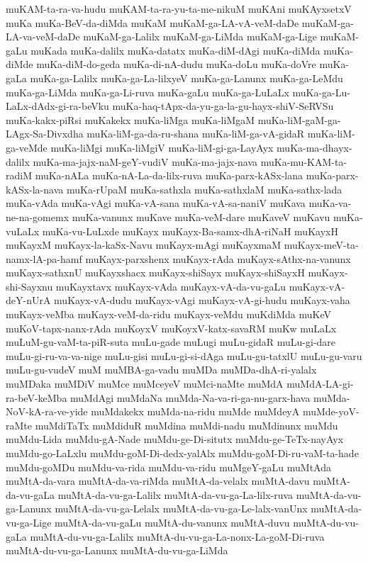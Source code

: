 {muKAM-ta-ra-va-hudu
muKAM-ta-ra-yu-ta-me-nikuM
muKAni
muKAyxsetxV
muKa
muKa-BeV-da-diMda
muKaM
muKaM-ga-LA-vA-veM-daDe
muKaM-ga-LA-va-veM-daDe
muKaM-ga-Lalilx
muKaM-ga-LiMda
muKaM-ga-Lige
muKaM-gaLu
muKada
muKa-dalilx
muKa-datatx
muKa-diM-dAgi
muKa-diMda
muKa-diMde
muKa-diM-do-geda
muKa-di-nA-dudu
muKa-doLu
muKa-doVre
muKa-gaLa
muKa-ga-Lalilx
muKa-ga-La-lilxyeV
muKa-ga-Lanunx
muKa-ga-LeMdu
muKa-ga-LiMda
muKa-ga-Li-ruva
muKa-gaLu
muKa-ga-LuLaLx
muKa-ga-Lu-LaLx-dAdx-gi-ra-beVku
muKa-haq-tApx-da-yu-ga-la-gu-hayx-shiV-SeRVSu
muKa-kakx-piRsi
muKakekx
muKa-liMga
muKa-liMgaM
muKa-liM-gaM-ga-LAgx-Sa-Divxdha
muKa-liM-ga-da-ru-shana
muKa-liM-ga-vA-gidaR
muKa-liM-ga-veMde
muKa-liMgi
muKa-liMgiV
muKa-liM-gi-ga-LayAyx
muKa-ma-dhayx-dalilx
muKa-ma-jajx-naM-geY-vudiV
muKa-ma-jajx-nava
muKa-mu-KAM-ta-radiM
muKa-nALa
muKa-nA-La-da-lilx-ruva
muKa-parx-kASx-lana
muKa-parx-kASx-la-nava
muKa-rUpaM
muKa-sathxla
muKa-sathxlaM
muKa-sathx-lada
muKa-vAda
muKa-vAgi
muKa-vA-sana
muKa-vA-sa-naniV
muKava
muKa-va-ne-na-gomemx
muKa-vanunx
muKave
muKa-veM-dare
muKaveV
muKavu
muKa-vuLaLx
muKa-vu-LuLxde
muKayx
muKayx-Ba-samx-dhA-riNaH
muKayxH
muKayxM
muKayx-la-kaSx-Navu
muKayx-mAgi
muKayxmaM
muKayx-meV-ta-namx-lA-pa-hamf
muKayx-parxshenx
muKayx-rAda
muKayx-sAthx-na-vanunx
muKayx-sathxnU
muKayxshacx
muKayx-shiSayx
muKayx-shiSayxH
muKayx-shi-Sayxnu
muKayxtavx
muKayx-vAda
muKayx-vA-da-vu-gaLu
muKayx-vA-deY-nUrA
muKayx-vA-dudu
muKayx-vAgi
muKayx-vA-gi-hudu
muKayx-vaha
muKayx-veMba
muKayx-veM-da-ridu
muKayx-veMdu
muKdiMda
muKeV
muKoV-tapx-nanx-rAda
muKoyxV
muKoyxV-katx-savaRM
muKw
muLaLx
muLuM-gu-vaM-ta-piR-suta
muLu-gade
muLugi
muLu-gidaR
muLu-gi-dare
muLu-gi-ru-va-va-nige
muLu-gisi
muLu-gi-si-dAga
muLu-gu-tatxlU
muLu-gu-varu
muLu-gu-vudeV
muM
muMBA-ga-vadu
muMDa
muMDa-dhA-ri-yalalx
muMDaka
muMDiV
muMce
muMceyeV
muMci-naMte
muMdA
muMdA-LA-gi-ra-beV-keMba
muMdAgi
muMdaNa
muMda-Na-va-ri-ga-nu-garx-hava
muMda-NoV-kA-ra-ve-yide
muMdakekx
muMda-na-ridu
muMde
muMdeyA
muMde-yoV-raMte
muMdiTaTx
muMdiduR
muMdina
muMdi-nadu
muMdinunx
muMdu
muMdu-Lida
muMdu-gA-Nade
muMdu-ge-Di-situtx
muMdu-ge-TeTx-nayAyx
muMdu-go-LaLxlu
muMdu-goM-Di-dedx-yalAlx
muMdu-goM-Di-ru-vaM-ta-hade
muMdu-goMDu
muMdu-va-rida
muMdu-va-ridu
muMgeY-gaLu
muMtAda
muMtA-da-vara
muMtA-da-va-riMda
muMtA-da-velalx
muMtA-davu
muMtA-da-vu-gaLa
muMtA-da-vu-ga-Lalilx
muMtA-da-vu-ga-La-lilx-ruva
muMtA-da-vu-ga-Lanunx
muMtA-da-vu-ga-Lelalx
muMtA-da-vu-ga-Le-lalx-vanUnx
muMtA-da-vu-ga-Lige
muMtA-da-vu-gaLu
muMtA-du-vanunx
muMtA-duvu
muMtA-du-vu-gaLa
muMtA-du-vu-ga-Lalilx
muMtA-du-vu-ga-La-nonx-La-goM-Di-ruva
muMtA-du-vu-ga-Lanunx
muMtA-du-vu-ga-LiMda
}
